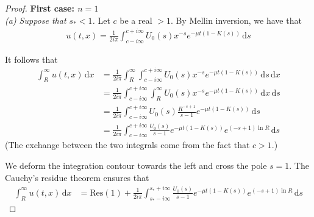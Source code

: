 \documentclass[11pt]{amsart}
\newcommand{\diff}{\,\mathrm{d}}
\begin{document}
        \begin{proof}

            \textbf{First case: $ n = 1$} \\ 
            \textit{(a) Suppose that $s_* < 1$.} Let $c$ be a real $>1$. 
            By Mellin inversion, we have that
            \begin{align*}
                u(t,x) = \frac{1}{2i\pi}\int_{c-i\infty}^{c+i\infty} U_0(s) x^{-s} e^{-\mu t(1 - K(s))} \diff s
            \end{align*}
            
            It follows that
            \begin{align*}
                \int_R^\infty u(t,x) \diff x 
                &= \frac{1}{2i\pi} \int_R^\infty \int_{c-i\infty}^{c+i\infty} U_0(s) x^{-s} e^{-\mu t(1 - K(s))} \diff s \diff x \\
                &= \frac{1}{2i\pi} \int_{c-i\infty}^{c+i\infty} \int_R^\infty U_0(s) x^{-s} e^{-\mu t(1 - K(s))} \diff x \diff s \\
                &= \frac{1}{2i\pi} \int_{c-i\infty}^{c+i\infty} U_0(s) \frac{R^{-s+1}}{s-1} e^{-\mu t(1 - K(s))} \diff s \\
                &= \frac{1}{2i\pi} \int_{c-i\infty}^{c+i\infty}\frac{U_0(s)}{s-1} e^{-\mu t(1 - K(s))} e^{(-s+1)\ln R} \diff s 
            \end{align*}
            (The exchange between the two integrals come from the fact that $c > 1$.)
            
            We deform the integration contour towards the left and cross the pole $s = 1$. The Cauchy's residue theorem ensures that
            \begin{align}
                \int_R^\infty u(t,x) \diff x &= \mathrm{Res(1)} + \frac{1}{2i\pi} \int_{s_*-i\infty}^{s_*+i\infty} \frac{U_0(s)}{s-1} e^{-\mu t(1 - K(s))} e^{(-s+1)\ln R} \diff s
                \label{eq:cauchy1}
            \end{align}
            

\end{proof}
\end{document}
